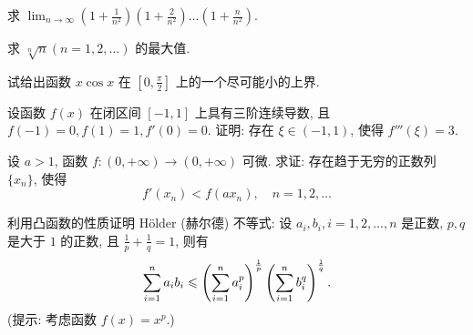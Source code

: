 \begin{exercise}[3.C.15]
    求 $\displaystyle \lim_{n \to \infty} \left(1 + \frac{1}{n^2}\right) \left(1 + \frac{2}{n^2}\right) \dots \left(1 + \frac{n}{n^2}\right)$.
\end{exercise}

\begin{exercise}[3.C.16]
    求 $\sqrt[n]{n} (n=1, 2, \dots)$ 的最大值.
\end{exercise}

\begin{exercise}[3.C.17]
    试给出函数 $x \cos x$ 在 $[0, \frac{\pi}{2}]$ 上的一个尽可能小的上界.
\end{exercise}

\begin{exercise}[3.C.18]
    设函数 $f(x)$ 在闭区间 $[-1, 1]$ 上具有三阶连续导数, 且 $f(-1) = 0, f(1) = 1, f'(0) = 0$. 证明: 存在 $\xi \in (-1, 1)$, 使得 $f'''(\xi) = 3$.
\end{exercise}

\begin{exercise}[3.C.19]
    设 $a > 1$, 函数 $f: (0, +\infty) \to (0, +\infty)$ 可微. 求证: 存在趋于无穷的正数列 $\{x_n\}$, 使得
    $$f'(x_n) < f(a x_n), \quad n=1, 2, \dots$$
\end{exercise}

\begin{exercise}[3.C.20]
    利用凸函数的性质证明 Hölder (赫尔德) 不等式: 设 $a_i, b_i, i = 1, 2, \dots, n$ 是正数, $p, q$ 是大于 $1$ 的正数, 且 $\frac{1}{p} + \frac{1}{q} = 1$, 则有
    $$\sum_{i=1}^n a_i b_i \leqslant \left(\sum_{i=1}^n a_i^p\right)^{\frac{1}{p}} \left(\sum_{i=1}^n b_i^q\right)^{\frac{1}{q}}.$$
    (提示: 考虑函数 $f(x) = x^p$.)
\end{exercise}